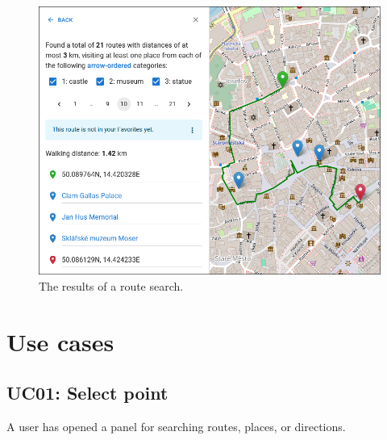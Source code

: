 \clearpage

\begin{figure}
  \centering
  \includegraphics[width=1.00\linewidth]{img/attach/uc04-search-routes-result.png}
  \caption{The results of a route search.}
  \label{fig:uc04-search-routes-result}
\end{figure}

\clearpage

\section{Use cases}\label{sec:use-cases-attached}

\subsection{UC01: Select point}\label{sssec:uc-select-point}


\begin{ucitemize}
\item A user has opened a panel for searching routes, places, or directions.
\end{ucitemize}


